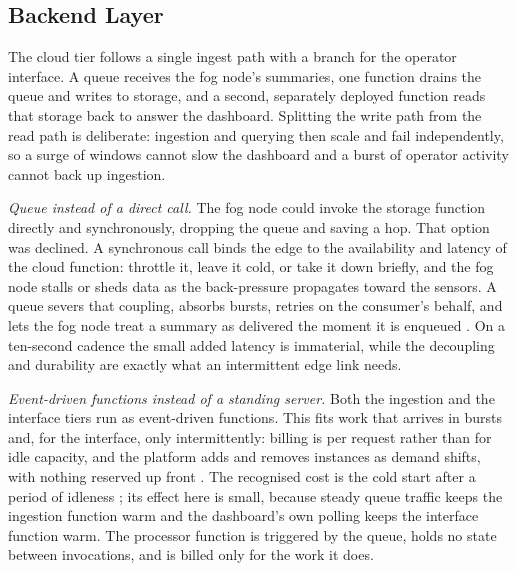 \documentclass[conference]{IEEEtran}
\begin{document}
\subsection{Backend Layer}

The cloud tier follows a single ingest path with a branch for the operator interface. A queue receives the fog node's summaries, one function drains the queue and writes to storage, and a second, separately deployed function reads that storage back to answer the dashboard. Splitting the write path from the read path is deliberate: ingestion and querying then scale and fail independently, so a surge of windows cannot slow the dashboard and a burst of operator activity cannot back up ingestion.

\textit{Queue instead of a direct call.} The fog node could invoke the storage function directly and synchronously, dropping the queue and saving a hop. That option was declined. A synchronous call binds the edge to the availability and latency of the cloud function: throttle it, leave it cold, or take it down briefly, and the fog node stalls or sheds data as the back-pressure propagates toward the sensors. A queue severs that coupling, absorbs bursts, retries on the consumer's behalf, and lets the fog node treat a summary as delivered the moment it is enqueued \cite{hohpe2003}. On a ten-second cadence the small added latency is immaterial, while the decoupling and durability are exactly what an intermittent edge link needs.

\textit{Event-driven functions instead of a standing server.} Both the ingestion and the interface tiers run as event-driven functions. This fits work that arrives in bursts and, for the interface, only intermittently: billing is per request rather than for idle capacity, and the platform adds and removes instances as demand shifts, with nothing reserved up front \cite{armbrust2010}. The recognised cost is the cold start after a period of idleness \cite{wang2018}; its effect here is small, because steady queue traffic keeps the ingestion function warm and the dashboard's own polling keeps the interface function warm. The processor function is triggered by the queue, holds no state between invocations, and is billed only for the work it does.
\end{document}
